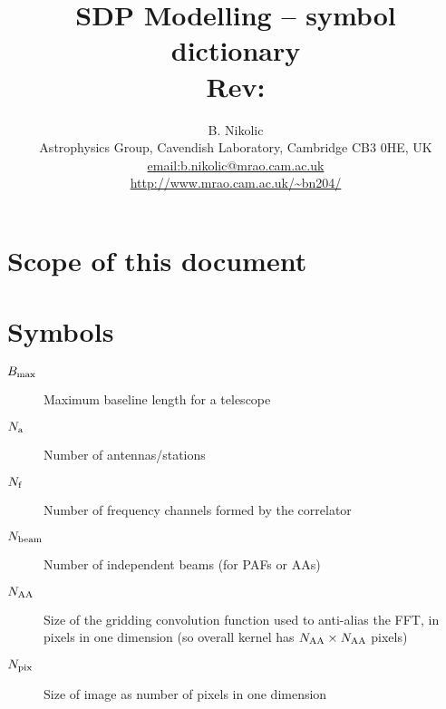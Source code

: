 \documentclass[useAMS,usenatbib,referee]{article}
\title{SDP Modelling -- symbol dictionary\\
  Rev: }
\author{B. Nikolic\\
  Astrophysics Group, Cavendish Laboratory, Cambridge CB3 0HE, UK
  \\\url{email:b.nikolic@mrao.cam.ac.uk}
 \\\url{http://www.mrao.cam.ac.uk/~bn204/}}
\begin{document}
\maketitle

\tableofcontents

\section{Scope of this document}

\section{Symbols}

\begin{description}
  \item[$B_{\rm max}$] Maximum baseline length for a telescope
  \item[$N_{\rm a}$] Number of antennas/stations
  \item[$N_{\rm f}$] Number of frequency channels formed by the
    correlator
  \item[$N_{\rm beam}$] Number of independent beams (for PAFs or AAs)
  \item[$N_{\rm AA}$] Size of the gridding convolution function used
    to anti-alias the FFT, in pixels in one dimension (so overall
    kernel has $N_{\rm AA} \times N_{\rm AA}$ pixels)
  \item[$N_{\rm pix}$] Size of image as number of pixels in one dimension
\end{description}
\end{document}

